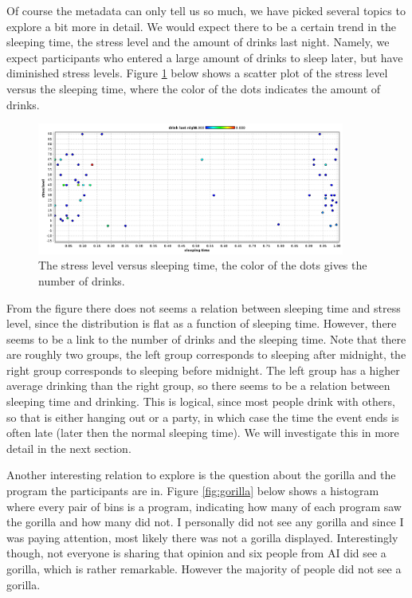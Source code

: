 \documentclass[11pt,a4paper,onecolumn]{article}
\begin{document}
Of course the metadata can only tell us so much, we have picked several topics to explore a bit more in detail. We would expect there to be a certain trend in the sleeping time, the stress level and the amount of drinks last night. Namely, we expect participants who entered a large amount of drinks to sleep later, but have diminished stress levels. Figure \ref{fig:sleeptime} below shows a scatter plot of the stress level versus the sleeping time, where the color of the dots indicates the amount of drinks.

\begin{figure}[h]
  \centering
  \includegraphics[width=0.9\textwidth]{sleeptime.png}
  \caption{The stress level versus sleeping time, the color of the dots gives the number of drinks.}
  \label{fig:sleeptime}
\end{figure}

From the figure there does not seems a relation between sleeping time and stress level, since the distribution is flat as a function of sleeping time. However, there seems to be a link to the number of drinks and the sleeping time. Note that there are roughly two groups, the left group corresponds to sleeping after midnight, the right group corresponds to sleeping before midnight. The left group has a higher average drinking than the right group, so there seems to be a relation between sleeping time and drinking. This is logical, since most people drink with others, so that is either hanging out or a party, in which case the time the event ends is often late (later then the normal sleeping time). We will investigate this in more detail in the next section.

Another interesting relation to explore is the question about the gorilla and the program the participants are in. Figure \ref{fig:gorilla} below shows a histogram where every pair of bins is a program, indicating how many of each program saw the gorilla and how many did not. I personally did not see any gorilla and since I was paying attention, most likely there was not a gorilla displayed. Interestingly though, not everyone is sharing that opinion and six people from AI did see a gorilla, which is rather remarkable. However the majority of people did not see a gorilla.
\end{document}

